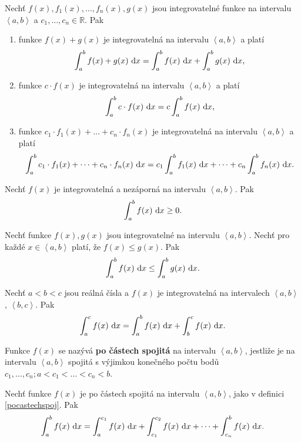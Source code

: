 \begin{veta}
Nechť $f(x), f_1(x),\dots,f_n(x), g(x)$ jsou integrovatelné funkce na intervalu $\left<  a,b \right> $
a $c_1,\dots,c_n\in \mathbb R.$ Pak
\begin{enumerate}[$i.$]
\item funkce $f(x)+g(x)$ je integrovatelná na intervalu $\left<  a,b \right> $ a platí
$$\int _a^b f(x)+g(x) \, \mathop{}\!\mathrm{d} x = \int_a ^b f(x)\, \mathop{}\!\mathrm{d} x + \int_a ^b g(x) \, \mathop{}\!\mathrm{d} x,$$
\item funkce $c\cdot f(x)$ je integrovatelná na intervalu $\left<  a,b \right> $ a platí
$$\int _a ^b c\cdot f(x) \, \mathop{}\!\mathrm{d} x = c \int _a ^b f(x)\, \mathop{}\!\mathrm{d} x,$$
\item funkce $c_1\cdot f_1(x) + \dots + c_n \cdot f_n(x)$ je integrovatelná na intervalu $\left<  a,b \right> $ a platí
$$\int_a ^b c_1\cdot f_1(x) + \dots + c_n \cdot f_n (x) \, \mathop{}\!\mathrm{d} x = c_1 \int _a ^b f_1(x)\, \mathop{}\!\mathrm{d} x + \dots + c_n \int _a ^b f_n(x)\, \mathop{}\!\mathrm{d} x. $$
\end{enumerate}
\end{veta}

\begin{veta}
Nechť $f(x)$ je integrovatelná a nezáporná na intervalu $\left<  a,b \right> $. Pak
$$\int_a ^b f(x) \, \mathop{}\!\mathrm{d} x \geq 0.$$
\end{veta}

\begin{veta}
Nechť funkce $f(x),g(x)$ jsou integrovatelné na intervalu $\left<  a,b \right> .$
Nechť pro každé $x\in \left<  a,b \right>$ platí, že $f(x)\leq g(x).$ Pak
$$\int_a^b f(x) \, \mathop{}\!\mathrm{d} x \leq \int_a^b g(x) \, \mathop{}\!\mathrm{d} x.$$
\end{veta}

\begin{veta}
Nechť $a<b<c$ jsou reálná čísla a $f(x)$ je integrovatelná na intervalech
$\left<  a,b \right>$, $\left<  b,c \right>$. Pak
$$\int_a^c f(x)\, \mathop{}\!\mathrm{d} x = \int_a^b f(x)\, \mathop{}\!\mathrm{d} x + \int_b^c f(x)\, \mathop{}\!\mathrm{d} x.$$
\end{veta}

\begin{definition}\label{pocastechspoj}
Funkce $f(x)$ se nazývá \textbf{po částech spojitá} na intervalu $\left<  a,b \right> $,
jestliže je na intervalu $\left<  a,b \right> $ spojitá s výjimkou konečného počtu
bodů $c_1,\dots,c_n; a<c_1<\dots<c_n<b.$
\end{definition}

\begin{veta}
Nechť funkce $f(x)$ je po částech spojitá na intervalu $\left<  a,b \right> $, jako
v definici \ref{pocastechspoj}. Pak
$$\int_a^b f(x)\, \mathop{}\!\mathrm{d} x = \int_a^{c_1}f(x)\, \mathop{}\!\mathrm{d} x + \int_{c_1}^{c_2}f(x)\, \mathop{}\!\mathrm{d} x + \dots + \int_{c_n}^b f(x)\, \mathop{}\!\mathrm{d} x.$$
\end{veta}


